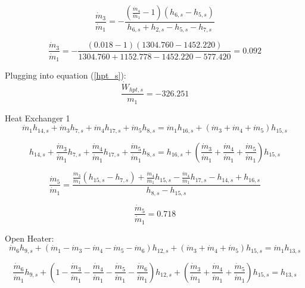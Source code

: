 \documentclass{article}
\begin{document}
\begin{equation}
\frac{\dot{m}_{3}}{\dot{m}_{1}} = -\frac{(\frac{\dot{m}_{4}}{\dot{m}_{ 1}} - 1)(h_{6,s} - h_{5,s})}{h_{6,s} + h_{2,s} - h_{5,s} - h_{7,s}}
\end{equation}

\begin{equation}
\frac{\dot{m}_{3}}{\dot{m}_{1}} = -\frac{(   0.018 - 1)(1304.760 - 1452.220)}{1304.760 + 1152.778 - 1452.220 -  577.420} =    0.092
\end{equation}


Plugging into equation (\ref{hpt_s}):
\begin{equation}
\frac{\dot{W}_{hpt,s}}{m_1} = -326.251
\end{equation}


Heat Exchanger 1
\begin{equation}
\dot{m}_{ 1}h_{14,s} + \dot{m}_{ 3}h_{ 7,s} + \dot{m}_{ 4}h_{17,s} + \dot{m}_{ 5}h_{ 8,s} = \dot{m}_{ 1}h_{16,s} + (\dot{m}_{ 3} + \dot{m}_{ 4} + \dot{m}_{ 5})h_{15,s}
\end{equation}

\begin{equation}
h_{14,s} + \frac{\dot{m}_{ 3}}{\dot{m}_{ 1}}h_{ 7,s} + \frac{\dot{m}_{ 4}}{\dot{m}_{ 1}}h_{17,s} + \frac{\dot{m}_{ 5}}{\dot{m}_{ 1}}h_{ 8,s} = h_{16,s} + (\frac{\dot{m}_{ 3}}{\dot{m}_{ 1}} + \frac{\dot{m}_{ 4}}{\dot{m}_{ 1}} + \frac{\dot{m}_{ 5}}{\dot{m}_{ 1}})h_{15,s}
\end{equation}

\begin{equation}
\frac{\dot{m}_{5}}{\dot{m}_{1}} = \frac{\frac{\dot{m}_{3}}{\dot{m}_{1}}(h_{15,s} - h_{7,s}) + \frac{\dot{m}_{4}}{\dot{m}_{1}}h_{15,s} - \frac{\dot{m}_{4}}{\dot{m}_{1}}h_{17,s} - h_{14,s} + h_{16,s}}{h_{8,s} - h_{15,s}}
\end{equation}

\begin{equation}
\frac{\dot{m}_{5}}{\dot{m}_{1}} =    0.718
\end{equation}


Open Heater:
\begin{equation}
\dot{m}_{ 6}h_{ 9,s} + (\dot{m}_{ 1} - \dot{m}_{ 3} - \dot{m}_{ 4} - \dot{m}_{ 5} - \dot{m}_{ 6})h_{12,s} + (\dot{m}_{ 3} + \dot{m}_{ 4} + \dot{m}_{ 5})h_{15,s} = \dot{m}_{ 1}h_{13,s}
\end{equation}

\begin{equation}
\frac{\dot{m}_{ 6}}{\dot{m}_{ 1}}h_{ 9,s} + (1 - \frac{\dot{m}_{ 3}}{\dot{m}_{ 1}} - \frac{\dot{m}_{ 4}}{\dot{m}_{ 1}} - \frac{\dot{m}_{ 5}}{\dot{m}_{ 1}} - \frac{\dot{m}_{ 6}}{\dot{m}_{ 1}})h_{12,s} + (\frac{\dot{m}_{ 3}}{\dot{m}_{ 1}} + \frac{\dot{m}_{ 4}}{\dot{m}_{ 1}} + \frac{\dot{m}_{ 5}}{\dot{m}_{ 1}})h_{15,s} = h_{13,s}
\end{equation}
\end{document}
